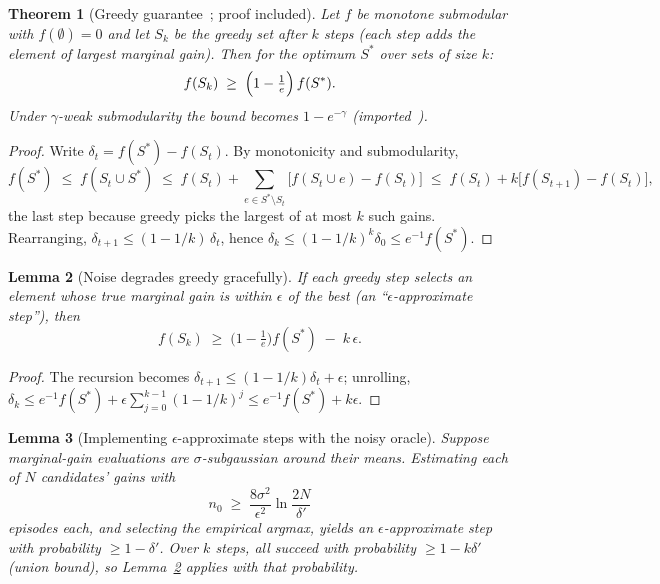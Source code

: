 \documentclass[11pt]{article}
\theoremstyle{plain}
\newtheorem{theorem}{Theorem}[section]
\newtheorem{lemma}[theorem]{Lemma}
\theoremstyle{definition}
\theoremstyle{remark}
\begin{document}
\begin{theorem}[Greedy guarantee~\cite{nwf78}; proof included]\label{thm:greedy}
Let $f$ be monotone submodular with $f(\emptyset) = 0$ and let $S_k$ be the
greedy set after $k$ steps (each step adds the element of largest marginal
gain). Then for the optimum $S^\ast$ over sets of size $k$:
\[
  f(S_k) \;\ge\; \Bigl(1 - \tfrac1e\Bigr)\, f(S^\ast).
\]
Under $\gamma$-weak submodularity the bound becomes $1 - e^{-\gamma}$
\textup{(imported~\cite{daskempe})}.
\end{theorem}

\begin{proof}
Write $\delta_t = f(S^\ast) - f(S_t)$. By monotonicity and submodularity,
\[
  f(S^\ast) \;\le\; f(S_t \cup S^\ast)
  \;\le\; f(S_t) + \sum_{e \in S^\ast \setminus S_t}
          \bigl[f(S_t \cup e) - f(S_t)\bigr]
  \;\le\; f(S_t) + k \bigl[f(S_{t+1}) - f(S_t)\bigr],
\]
the last step because greedy picks the largest of at most $k$ such gains.
Rearranging, $\delta_{t+1} \le (1 - 1/k)\, \delta_t$, hence $\delta_k \le
(1-1/k)^k \delta_0 \le e^{-1} f(S^\ast)$.
\end{proof}

\begin{lemma}[Noise degrades greedy gracefully]\label{lem:epsgreedy}
If each greedy step selects an element whose true marginal gain is within
$\epsilon$ of the best (an ``$\epsilon$-approximate step''), then
\[
  f(S_k) \;\ge\; \bigl(1 - \tfrac1e\bigr) f(S^\ast) \;-\; k\,\epsilon .
\]
\end{lemma}

\begin{proof}
The recursion becomes $\delta_{t+1} \le (1 - 1/k)\delta_t + \epsilon$;
unrolling, $\delta_k \le e^{-1} f(S^\ast) + \epsilon \sum_{j=0}^{k-1} (1 -
1/k)^j \le e^{-1} f(S^\ast) + k\epsilon$.
\end{proof}

\begin{lemma}[Implementing $\epsilon$-approximate steps with the noisy oracle]
\label{lem:select}
Suppose marginal-gain evaluations are $\sigma$-subgaussian around their
means. Estimating each of $N$ candidates' gains with
\[
  n_0 \;\ge\; \frac{8\sigma^2}{\epsilon^2} \ln\frac{2N}{\delta'}
\]
episodes each, and selecting the empirical argmax, yields an
$\epsilon$-approximate step with probability $\ge 1 - \delta'$. Over $k$
steps, all succeed with probability $\ge 1 - k\delta'$
\textup{(union bound)}, so Lemma~\ref{lem:epsgreedy} applies with that
probability.
\end{lemma}
\end{document}
